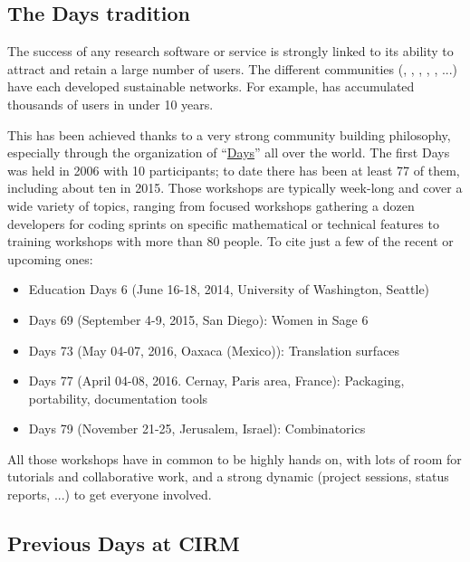 \documentclass[12pt]{amsart}
\begin{document}

\subsection{The \Sage Days tradition}

The success of any research software or service is strongly linked to
its ability to attract and retain a large number of users. The
different communities (\Sage, \GAP, \Pari, \Singular, \Jupyter, ...)
have each developed sustainable networks. For example, \Sage has
accumulated thousands of users in under 10 years.

This has been achieved thanks to a very strong community building
philosophy, especially through the organization of
“\href{https://wiki.sagemath.org/Workshops}{\Sage Days}” all over the
world. The first \Sage Days was held in 2006 with 10 participants; to
date there has been at least 77 of them, including about ten in
2015. Those workshops are typically week-long and cover a wide
variety of topics, ranging from focused workshops gathering a dozen
developers for coding sprints on specific mathematical or technical
features to training workshops with more than 80 people. To cite just
a few of the recent or upcoming ones:

\begin{itemize}
\item \Sage Education Days 6 (June 16-18, 2014, University of
  Washington, Seattle)
\item \Sage Days 69 (September 4-9, 2015, San Diego): Women in Sage 6
\item \Sage Days 73 (May 04-07, 2016, Oaxaca (Mexico)): Translation surfaces
\item \Sage Days 77 (April 04-08, 2016. Cernay, Paris area, France):
  Packaging, portability, documentation tools
\item \Sage Days 79 (November 21-25, Jerusalem, Israel): Combinatorics
\end{itemize}

All those workshops have in common to be highly hands on, with lots of
room for tutorials and collaborative work, and a strong dynamic
(project sessions, status reports, ...) to get everyone involved.

\subsection{Previous \Sage Days at CIRM}
\end{document}
